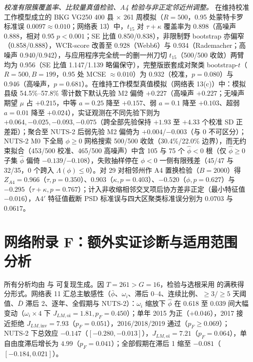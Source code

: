 \documentclass[11pt,a4paper]{ctexart}
\theoremstyle{definition}
\begin{document}
\emph{校准有限簇覆盖率、比较量真值检验、A4 检验与非正定邻近州调整。} 在维持校准工作模型成立的 BKG VG250 400 县 $\times$ 261 周模拟（$R=500$，0.95 处蒙特卡罗标准误 $0.0097\approx 0.010$；网络表 13）中，$t_{15}$ 对 $\tau+\kappa$ 覆盖率为 0.898（高噪声 0.888，相对 0.95 $p<0.001$；SE 比值 0.850/0.838），非限制野 bootstrap 亦偏窄（0.858/0.888），WCR-score 改善至 0.928（Webb6）与 0.934（Rademacher；高噪声 0.940/0.942），与应用程序完全统一的删一州刀切 $t_{15}$（500/500 收敛）两臂均为 0.956（SE 比值 1.147/1.139 略偏保守），完整版嵌套成对聚类 bootstrap-$t$（$R=500, B=199$，0.95 处 MCSE $\approx 0.010$）为 0.932（校准，$p=0.080$）与 0.946（高噪声，$p=0.681$）。在维持工作模型真值模拟（网络表 13(c)）中：模拟县级 54.5\%--57.8\% 零计数下默认先验 M2 偏倚 $+0.227$（高噪声 $+0.227$；无噪声期望 $\mu$ 占 $+0.215$，中等 $a=0.25$ 降至 $+0.157$、弱 $a=0.1$ 降至 $+0.103$、超弱 $a=0.01$ 降至 $+0.024$），实证观测在不同先验下则为 $+0.064, -0.025, -0.093, -0.075$（跨全部先验保持 $+1.93$ 至 $+4.33$ 个校准 SD 正差距）；聚合至 NUTS-2 后弱先验 M2 偏倚为 $+0.004$/$-0.003$（与 0 不可区分）；NUTS-2 M0 下全局 $\phi\ge 0$ 网格搜索 500/500 收敛（30.4\%/22.0\% 边界），而无约束拟合（453/500 校准、465/500 高噪声）中含 105 与 75 个 $\hat\phi<0$ 根（仅 $\hat\phi\ge 0$ 子集 $\hat\phi$ 偏倚 $-0.139$/$-0.108$），失败抽样停在 $\phi<0$ 一侧有限残差（45/47 与 32/35，0 个跨入 $\Lambda(\phi)\le 0$）。对 29 对相邻州作 A4 置换检验（$B=2000$）得 $Z_{A4}=0.966$（$\tau, p=0.350$）、$0.903$（$\kappa, p=0.403$）、$-0.520$（$\phi, p=0.627$）与 $-0.295$（$\tau+\kappa, p=0.767$）；计入非收缩相邻交叉项后协方差非正定（最小特征值 $-0.016$），A4$'$ 特征值截断 PSD 标准误与四大区聚类标准误分别为 $0.0703$ 与 $0.0617$。

\section*{网络附录 F：额外实证诊断与适用范围分析}

所有分析均由  与  可复现生成。因 $T=261>G=16$，检验与选根采用  的满秩得分形式。网络表 11 汇总主敏感性（$\bar\phi$、$\omega_i$、滞后 0--4、连续比例、$\ge 3/\ge 5$ 天阈值、$\bar D$ 滞后 2、逐年、全假期与 NUTS-2）：$\omega_i$ 缩放下 $\hat\phi$ 在 0.618 至 0.039 间大幅变动（$\omega_i\times 4$ 下 $J_{LM,\mathrm{oi}}=1.81, p_F=0.450$）；单年 2015 为正（$+0.046$），2017 接近拒绝 $J_{LM,\mathrm{inv}}=7.93$（$p_F=0.051$），2016/2018/2019 通过（$p_F\ge 0.069$）；NUTS-2 下总效应 $-0.147$（$[-0.280,-0.013]$），$J_{LM,\mathrm{oi}}=7.21$（$p_F=0.064$），单自由度滞后增长为 $4.99$（$p_F=0.041$）；全部假期在滞后 1 缩至 $-0.081$（$[-0.184,0.021]$）。
\end{document}
